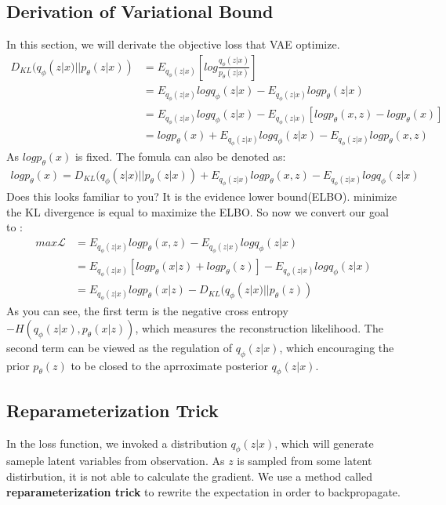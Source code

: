 \documentclass{article}
\begin{document}
\subsection{Derivation of Variational Bound}
In this section, we will derivate the objective loss that VAE optimize.
\begin{align*}
D_{KL}(q_{\phi}(z|x)||p_{\theta}(z|x)) &= E_{q_{\phi}(z|x)} \left[ log \frac{q_{\phi}(z|x)}{p_{\theta}(z|x)} \right] \\
&= E_{q_{\phi}(z|x)}logq_{\phi}(z|x) -E_{q_{\phi}(z|x)} log p_{\theta}(z|x) \\
&= E_{q_{\phi}(z|x)}logq_{\phi}(z|x) -E_{q_{\phi}(z|x)}[log p_{\theta}(x,z)-log p_{\theta}(x)] \\
&= log p_{\theta}(x) + E_{q_{\phi}(z|x)}logq_{\phi}(z|x)- E_{q_{\phi}(z|x)}log p_{\theta}(x,z)
\end{align*}
As $log p_{\theta}(x)$ is fixed. The fomula can also be denoted as:
\begin{align*}
log p_{\theta}(x)=D_{KL}(q_{\phi}(z|x)||p_{\theta}(z|x)) + E_{q_{\phi}(z|x)}log p_{\theta}(x,z) -E_{q_{\phi}(z|x)}logq_{\phi}(z|x)
\end{align*}
Does this looks familiar to you? It is the evidence lower bound(ELBO). minimize the KL divergence is equal to maximize the ELBO. So now we convert our goal to :
\begin{align*}
max \mathcal{L} &= E_{q_{\phi}(z|x)}log p_{\theta}(x,z) -E_{q_{\phi}(z|x)}logq_{\phi}(z|x) \\
&= E_{q_{\phi}(z|x)}[logp_{\theta}(x|z)+logp_{\theta}(z)]-E_{q_{\phi}(z|x)}logq_{\phi}(z|x) \\
&= E_{q_{\phi}(z|x)}logp_{\theta}(x|z)-D_{KL}(q_{\phi}(z|x)||p_{\theta}(z))
\end{align*}
As you can see, the first term is the negative cross entropy $-H(q_{\phi}(z|x),p_{\theta}(x|z))$, which measures the reconstruction likelihood. The second term can be viewed as the regulation of $q_{\phi}(z|x)$, which encouraging the prior $p_{\theta}(z)$ to be closed to the aprroximate posterior $q_{\phi}(z|x)$.
\subsection{Reparameterization Trick}
In the loss function, we invoked a distribution $q_{\phi}(z|x)$, which will generate sameple latent variables from observation. As $z$ is sampled from some latent distirbution, it is not able to calculate the gradient. We use a method called \textbf{reparameterization trick} to rewrite the expectation in order to backpropagate.
\end{document}
